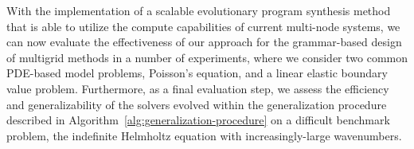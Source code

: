 With the implementation of a scalable evolutionary program synthesis method that is able to utilize the compute capabilities of current multi-node systems, we can now evaluate the effectiveness of our approach for the grammar-based design of multigrid methods in a number of experiments, where we consider two common PDE-based model problems, Poisson's equation, and a linear elastic boundary value problem.
Furthermore, as a final evaluation step, we assess the efficiency and generalizability of the solvers evolved within the generalization procedure described in Algorithm~\ref{alg:generalization-procedure} on a difficult benchmark problem, the indefinite Helmholtz equation with increasingly-large wavenumbers.

